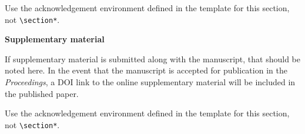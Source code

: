 \documentclass[twocolumn,10pt]{article} %
\renewcommand{\section}%
              [1]%
              {%
               \bgroup%
               \flushleft%
               \small\bf%
               \stepcounter{section}%
               \arabic{section}. #1%
               \par%
               \egroup%
              }%
\newcommand{\acknowledgement}%
              [1]%
              {%
               \bgroup%
               \flushleft%
               \small\bf%
               #1%
               \par%
               \egroup%
              }%
\begin{document}
Use the acknowledgement environment defined in the template for this section, not \verb+\section*+. 

\acknowledgement{Supplementary material} \addvspace{10pt}

If supplementary material is submitted along with the manuscript, that should be noted here. In the event that the manuscript is accepted for publication in the {\em Proceedings}, a DOI link to the online supplementary material will be included in the published paper.

Use the acknowledgement environment defined in the template for this section, not \verb+\section*+. 



 \footnotesize
 \baselineskip 9pt






\newpage

\small
\baselineskip 10pt


\end{document}
